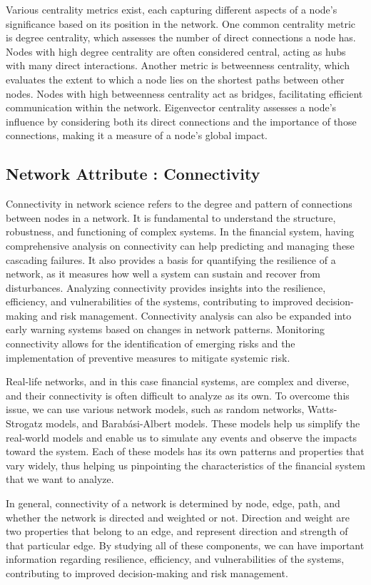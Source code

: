 \documentclass[a4paper,11pt]{article}
\begin{document}
Various centrality metrics exist, each capturing different aspects of a node's significance based on its position in the network. One common centrality metric is degree centrality, which assesses the number of direct connections a node has. Nodes with high degree centrality are often considered central, acting as hubs with many direct interactions. Another metric is betweenness centrality, which evaluates the extent to which a node lies on the shortest paths between other nodes. Nodes with high betweenness centrality act as bridges, facilitating efficient communication within the network. Eigenvector centrality assesses a node's influence by considering both its direct connections and the importance of those connections, making it a measure of a node's global impact.

\subsection{Network Attribute : Connectivity}
Connectivity in network science refers to the degree and pattern of connections between nodes in a network. It is fundamental to understand the structure, robustness, and functioning of complex systems. In the financial system, having comprehensive analysis on connectivity can help predicting and managing these cascading failures. It also provides a basis for quantifying the resilience of a network, as it measures how well a system can sustain and recover from disturbances. Analyzing connectivity provides insights into the resilience, efficiency, and vulnerabilities of the systems, contributing to improved decision-making and risk management. Connectivity analysis can also be expanded into early warning systems based on changes in network patterns. Monitoring connectivity allows for the identification of emerging risks and the implementation of preventive measures to mitigate systemic risk.

Real-life networks, and in this case financial systems, are complex and diverse, and their connectivity is often difficult to analyze as its own. To overcome this issue, we can use various network models, such as random networks, Watts-Strogatz models, and Barabási-Albert models. These models help us simplify the real-world models and enable us to simulate any events and observe the impacts toward the system. 
Each of these models has its own patterns and properties that vary widely, thus helping us pinpointing the characteristics of the financial system that we want to analyze.

In general, connectivity of a network is determined by node, edge, path, and whether the network is directed and weighted or not. Direction and weight are two properties that belong to an edge, and represent direction and strength of that particular edge. By studying all of these components, we can have important information regarding resilience, efficiency, and vulnerabilities of the systems, contributing to improved decision-making and risk management.
\end{document}

